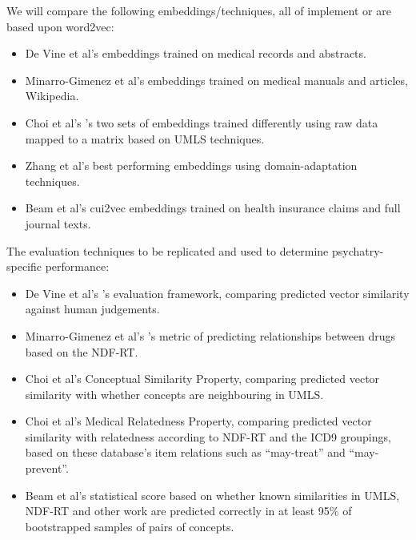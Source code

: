 \documentclass[10pt]{article}
\begin{document}
We will compare the following embeddings/techniques, all of implement or are based upon word2vec:
\begin{itemize}
	\item De Vine et al's  embeddings trained on medical records and abstracts.  
	\item Minarro-Gimenez et al's  embeddings trained on medical manuals and articles, Wikipedia.
	\item Choi et al's 's two sets of embeddings trained differently using raw data mapped to a matrix based on UMLS techniques.  
	\item Zhang et al's  best performing embeddings using domain-adaptation techniques. 
	\item Beam et al's cui2vec embeddings trained on health insurance claims and full journal texts. 
\end{itemize}

The evaluation techniques to be replicated and used to determine psychatry-specific performance:
\begin{itemize}
	\item De Vine et al's 's evaluation framework, comparing predicted vector similarity against human judgements.
	\item Minarro-Gimenez et al's 's metric of predicting relationships between drugs based on the NDF-RT. 
	\item Choi et al's  Conceptual Similarity Property, comparing predicted vector similarity with whether concepts are neighbouring in UMLS. 
	\item Choi et al's  Medical Relatedness Property, comparing predicted vector similarity with relatedness according to NDF-RT and the ICD9 groupings, based on these database's item relations such as ``may-treat'' and ``may-prevent''. 
	\item Beam et al's  statistical score based on whether known similarities in UMLS, NDF-RT and other work are predicted correctly in at least 95\% of bootstrapped samples of pairs of concepts. 
\end{itemize}
\end{document}
